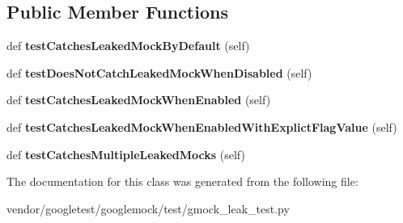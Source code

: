 \subsection*{Public Member Functions}
\begin{DoxyCompactItemize}
\item 
\mbox{\label{classgmock__leak__test_1_1_g_mock_leak_test_ad87d271de7b3f106e51272d6e9139c76}} 
def {\bfseries test\+Catches\+Leaked\+Mock\+By\+Default} (self)
\item 
\mbox{\label{classgmock__leak__test_1_1_g_mock_leak_test_a3107bf5a603558ab2d97d88fb5589951}} 
def {\bfseries test\+Does\+Not\+Catch\+Leaked\+Mock\+When\+Disabled} (self)
\item 
\mbox{\label{classgmock__leak__test_1_1_g_mock_leak_test_a78f4040a392d183597f71d92da8c1246}} 
def {\bfseries test\+Catches\+Leaked\+Mock\+When\+Enabled} (self)
\item 
\mbox{\label{classgmock__leak__test_1_1_g_mock_leak_test_ab19cf302ea06e1b186bd6ab951d9161e}} 
def {\bfseries test\+Catches\+Leaked\+Mock\+When\+Enabled\+With\+Explict\+Flag\+Value} (self)
\item 
\mbox{\label{classgmock__leak__test_1_1_g_mock_leak_test_a09465b2bfde98834e4bb9563c035f034}} 
def {\bfseries test\+Catches\+Multiple\+Leaked\+Mocks} (self)
\end{DoxyCompactItemize}


The documentation for this class was generated from the following file\+:\begin{DoxyCompactItemize}
\item 
vendor/googletest/googlemock/test/gmock\+\_\+leak\+\_\+test.\+py\end{DoxyCompactItemize}
